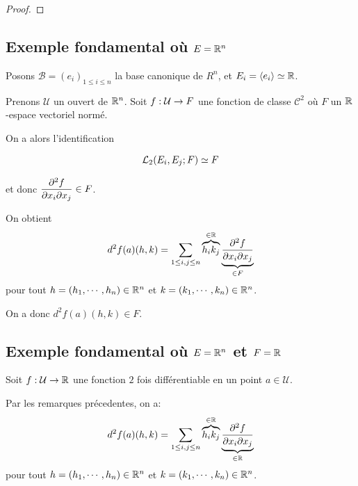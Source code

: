 \ifdefined\outputproof
\begin{proof}

\end{proof}
\fi

\subsection{Exemple fondamental où $E = \real^{n}$}

Posons $\mathcal{B} = (e_{i})_{1 \leq i \leq n}$ la base canonique de $R^{n}$,
et $E_{i} = \spanspace{e_{i}} \isomorph \real$.

Prenons $\mathcal{U}$ un ouvert de $\real^{n}$.
Soit $\GSfunction{f}{\mathcal{U}}{F}$ une fonction de classe $\mathcal{C}^{2}$ où
$F$ un $\real$-espace vectoriel normé.

On a alors l'identification

\begin{align*}
	\GScontinueHomo[2]{E_{i}, E_{j}}{F} \identification F
\end{align*}

et donc $ \displaystyle \pdv{f}{x_{i}}{x_{j}} (a) \in F$.

On obtient
\begin{equation*}
	d^{2}f(a) (h, k) = \displaystyle \sum_{1 \leq i, j \leq n} \overbrace{h_{i} k_{j}}^{\in
	\real} \underbrace{\pdv{f}{x_{i}}{x_{j}} (a)}_{\in F}
\end{equation*}
pour tout $h = (h_{1}, \cdots, h_{n}) \in \real^{n}$ et $k = (k_{1}, \cdots,
k_{n}) \in \real^{n}$.

On a donc $\displaystyle d^{2}f(a)(h, k) \in F$.



\subsection{Exemple fondamental où $E = \real^{n}$ et $F = \real$}

Soit $\GSfunction{f}{\mathcal{U}}{\real}$ une fonction $2$ fois différentiable
en un point $a \in \mathcal{U}$.

Par les remarques précedentes, on a:
\begin{equation*}
	d^{2}f(a) (h, k) = \displaystyle \sum_{1 \leq i, j \leq n} \overbrace{h_{i} k_{j}}^{\in
	\real} \underbrace{\pdv{f}{x_{i}}{x_{j}} (a)}_{\in \real}
\end{equation*}
pour tout $h = (h_{1}, \cdots, h_{n}) \in \real^{n}$ et $k = (k_{1}, \cdots,
k_{n}) \in \real^{n}$.

